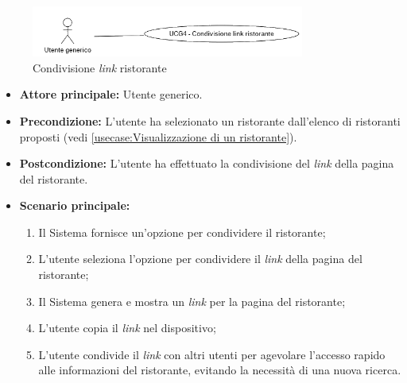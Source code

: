 \newpage
{}
\label{usecase:Condivisione link del ristorante}

\begin{figure}[h]
	\centering
	\includegraphics[width=0.8\textwidth]{./uml/UCG4.png} 
	\caption{Condivisione \textit{link} ristorante}
	\label{fig:UCG4}
  \end{figure}

\begin{itemize}
	\item \textbf{Attore principale:} Utente generico.


	\item \textbf{Precondizione:}
	      L'utente ha selezionato un ristorante dall'elenco di ristoranti
	      proposti (vedi \autoref{usecase:Visualizzazione di un ristorante}).

	\item \textbf{Postcondizione:}
	      L'utente ha effettuato la condivisione del \textit{link} della pagina del ristorante.

	\item \textbf{Scenario principale:}
	      \begin{enumerate}
		      \item Il Sistema fornisce un'opzione per condividere il ristorante;
		      \item L'utente seleziona l'opzione per condividere il \textit{link} della pagina del ristorante;
		      \item Il Sistema genera e mostra un \textit{link} per la pagina del ristorante;
		      \item L'utente copia il \textit{link} nel dispositivo;
		      \item L'utente condivide il \textit{link} con altri utenti per agevolare l'accesso rapido alle
		            informazioni del ristorante, evitando la necessità di una nuova ricerca.
	      \end{enumerate}
\end{itemize}
